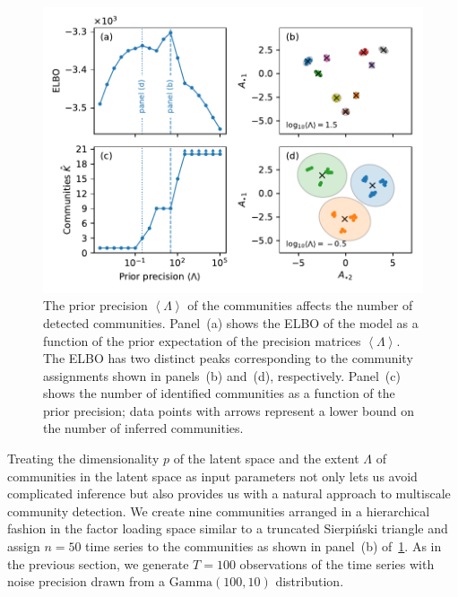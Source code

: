 \documentclass[onecolumn,pre,superscriptaddress, longbibliography, nofootinbib, notitlepage]{revtex4-1}
\newcommand{\E}[1]{\left\langle#1 \right\rangle}
\newcommand{\dgamma}{\mathrm{Gamma}}
\begin{document}
\begin{figure}
    \includegraphics{multiscale.pdf}
    \caption{\label{fig:multiscale} The prior precision $\E{\Lambda}$ of the communities affects the number of detected communities. Panel~(a) shows the ELBO of the model as a function of the prior expectation of the precision matrices $\E{\Lambda}$. The ELBO has two distinct peaks corresponding to the community assignments shown in panels~(b) and~(d), respectively. Panel~(c) shows the number of identified communities as a function of the prior precision; data points with arrows represent a lower bound on the number of inferred communities.}

\end{figure}

Treating the dimensionality $p$ of the latent space and the extent $\Lambda$ of communities in the latent space as input parameters
not only lets us avoid complicated inference 
but also provides us with a natural approach to multiscale community detection. 
We create nine communities arranged in a hierarchical fashion in the factor loading space similar to a truncated Sierpi\'nski triangle 
and assign $n=50$ time series to the communities as shown in panel~(b) of~\cref{fig:multiscale}. As in the previous section, we generate $T=100$ observations of the time series with noise precision drawn from a $\dgamma(100, 10)$ distribution.
\end{document}
